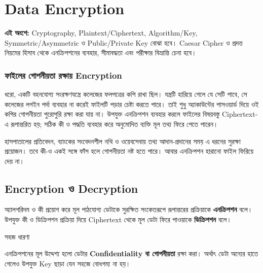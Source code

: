 
\section{Data Encryption}
\label{sec:ch06-data-encryption}



\textbf{এই অংশে:} Cryptography, Plaintext/Ciphertext, Algorithm/Key, Symmetric/Asymmetric ও Public/Private Key বোঝা হবে। Caesar Cipher ও প্রদত্ত নিয়মের হিসাব থেকে এনক্রিপশনের ব্যবহার, সীমাবদ্ধতা এবং পরীক্ষার বিভ্রান্তি চেনা হবে।


\subsubsection{ফাইলের গোপনীয়তা রক্ষায় Encryption}
ধরো, একটি বহনযোগ্য সংরক্ষণযন্ত্রে কলেজের ফলপত্রের কপি রাখা ছিল। যন্ত্রটি হারিয়ে গেলে যে সেটি পাবে, সে কলেজের লগইন পর্দা ব্যবহার না করেই ফাইলটি পড়ার চেষ্টা করতে পারে। তাই শুধু অ্যাকাউন্টের পাসওয়ার্ড দিয়ে ওই কপির গোপনীয়তা পুরোপুরি রক্ষা করা যায় না। উপযুক্ত এনক্রিপশন ব্যবহার করলে ফাইলের বিষয়বস্তু Ciphertext-এ রূপান্তরিত হয়; সঠিক কী ও পদ্ধতি ব্যবহার করে অনুমোদিত ব্যক্তি মূল তথ্য ফিরে পেতে পারেন।

হাসপাতালের প্রতিবেদন, ব্যাংকের সংবেদনশীল নথি ও ওয়েবসেবায় তথ্য আদান-প্রদানের সময় এ ধরনের সুরক্ষা প্রয়োজন। তবে কী-ও একই সঙ্গে ফাঁস হলে গোপনীয়তা নষ্ট হতে পারে। আবার এনক্রিপশন হারানো ফাইল ফিরিয়ে দেয় না।

\subsection{Encryption ও Decryption}

\begin{definitionbox}{}

অ্যালগরিদম ও কী প্রয়োগ করে মূল পাঠযোগ্য ডেটাকে সুরক্ষিত সংকেতরূপে রূপান্তরের প্রক্রিয়াকে \textbf{এনক্রিপশন} বলে। উপযুক্ত কী ও ডিক্রিপশন প্রক্রিয়া দিয়ে Ciphertext থেকে মূল ডেটা ফিরে পাওয়াকে \textbf{ডিক্রিপশন} বলে।

\end{definitionbox}


\begin{keypointbox}{সহজ ধারণা}

এনক্রিপশনের মূল উদ্দেশ্য হলো ডেটার
\textbf{Confidentiality বা গোপনীয়তা} রক্ষা করা। অর্থাৎ ডেটা অন্যের হাতে গেলেও উপযুক্ত Key ছাড়া যেন সহজে
বোধগম্য না হয়।

\end{keypointbox}


